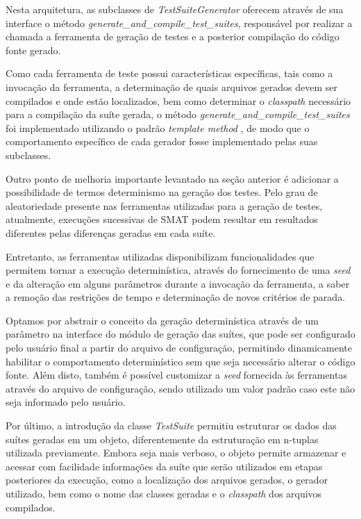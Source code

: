 \documentclass[12pt]{article}
\begin{document}
Nesta arquitetura, as subclasses de \textit{TestSuiteGenerator} oferecem através de sua interface o método \textit{generate\_and\_compile\_test\_suites}, responsável por realizar a chamada a ferramenta de geração de testes e a posterior compilação do código fonte gerado.

Como cada ferramenta de teste possui características específicas, tais como a invocação da ferramenta, a determinação de quais arquivos gerados devem ser compilados e onde estão localizados, bem como determinar o \textit{classpath} necessário para a compilação da suíte gerada, o método \textit{generate\_and\_compile\_test\_suites} foi implementado utilizando o padrão \textit{template method} \cite{gof}, de modo que o comportamento específico de cada gerador fosse implementado pelas suas subclasses.

Outro ponto de melhoria importante levantado na seção anterior é adicionar a possibilidade de termos determinismo na geração dos testes. Pelo grau de aleatoriedade presente nas ferramentas utilizadas para a geração de testes, atualmente, execuções sucessivas de SMAT podem resultar em resultados diferentes pelas diferenças geradas em cada suíte.

Entretanto, as ferramentas utilizadas disponibilizam funcionalidades que permitem tornar a execução determinística, através do fornecimento de uma \textit{seed} e da alteração em alguns parâmetros durante a invocação da ferramenta, a saber a remoção das restrições de tempo e determinação de novos critérios de parada.

Optamos por abstrair o conceito da geração determinística através de um parâmetro na interface do módulo de geração das suítes, que pode ser configurado pelo usuário final a partir do arquivo de configuração, permitindo dinamicamente habilitar o comportamento determinístico sem que seja necessário alterar o código fonte. Além disto, também é possível customizar a \textit{seed} fornecida às ferramentas através do arquivo de configuração, sendo utilizado um valor padrão caso este não seja informado pelo usuário.

Por último, a introdução da classe \textit{TestSuite} permitiu estruturar os dados das suítes geradas em um objeto, diferentemente da estruturação em n-tuplas utilizada previamente. Embora seja mais verboso, o objeto permite armazenar e acessar com facilidade informações da suíte que serão utilizados em etapas posteriores da execução, como a localização dos arquivos gerados, o gerador utilizado, bem como o nome das classes geradas e o \textit{classpath} dos arquivos compilados.
\end{document}
